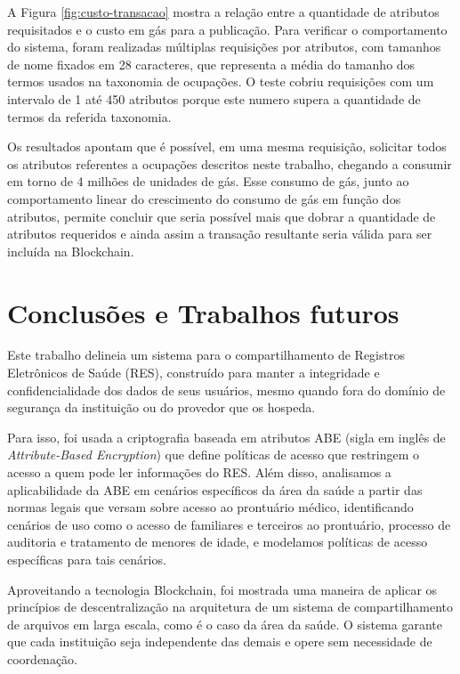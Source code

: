 \documentclass[a4paper,11pt]{article}
\begin{document}
A Figura \ref{fig:custo-transacao} mostra a relação entre a quantidade de atributos requisitados e o custo em gás para a publicação.
Para verificar o comportamento do sistema, foram realizadas múltiplas requisições por atributos, com tamanhos de nome fixados em 28 caracteres, que representa a média do tamanho dos termos usados na taxonomia de ocupações.
O teste cobriu requisições com um intervalo de 1 até 450 atributos porque este numero supera a quantidade de termos da referida taxonomia.

Os resultados apontam que é possível, em uma mesma requisição, solicitar todos os atributos referentes a ocupações descritos neste trabalho, chegando a consumir em torno de 4 milhões de unidades de gás.
Esse consumo de gás, junto ao comportamento linear do crescimento do consumo de gás em função dos atributos, permite concluir que seria possível mais que dobrar a quantidade de atributos requeridos e ainda assim a transação resultante seria válida para ser incluída na Blockchain.


\newpage
\section{Conclusões e Trabalhos futuros}

Este trabalho delineia um sistema para o compartilhamento de Registros Eletrônicos de Saúde (RES), construído para manter a integridade e confidencialidade dos dados de seus usuários, mesmo quando fora do domínio de segurança da instituição ou do provedor que os hospeda.

Para isso, foi usada a criptografia baseada em atributos ABE (sigla em inglês de \emph{Attribute-Based Encryption}) que define políticas de acesso que restringem o acesso a quem pode ler informações do RES.
Além disso, analisamos a aplicabilidade da ABE em cenários específicos da área da saúde a partir das normas legais que versam sobre acesso ao prontuário médico, identificando cenários de uso como o acesso de familiares e terceiros ao prontuário, processo de auditoria e tratamento de menores de idade, e modelamos políticas de acesso específicas para tais cenários.

Aproveitando a tecnologia Blockchain, foi mostrada uma maneira de aplicar os princípios de descentralização na arquitetura de um sistema de compartilhamento de arquivos em larga escala, como é o caso da área da saúde.
O sistema garante que cada instituição seja independente das demais e opere sem necessidade de coordenação.
\end{document}
